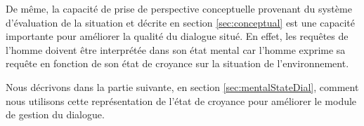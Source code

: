 \documentclass[a4paper,11pt,twoside]{StyleThese}
\begin{document}
De même, la capacité de prise de perspective conceptuelle provenant du système d'évaluation de la situation et décrite en section \ref{sec:conceptual} est une capacité importante pour améliorer la qualité du dialogue situé.
En effet, les requêtes de l'homme doivent être interprétée dans son état mental car l'homme exprime sa requête en fonction de son état de croyance sur la situation de l'environnement.

Nous décrivons dans la partie suivante, en section \ref{sec:mentalStateDial}, comment nous utilisons cette représentation de l'état de croyance pour améliorer le module de gestion du dialogue.



\end{document}

